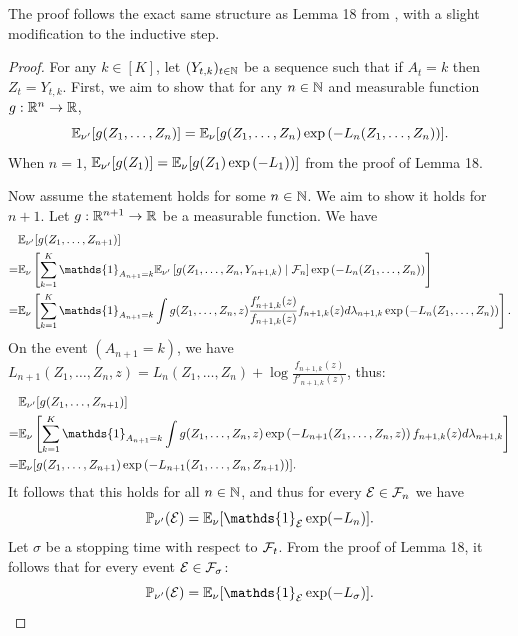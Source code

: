The proof follows the exact same structure as Lemma 18 from \citet{kaufmann2016complexity}, with a slight modification to the inductive step.
\begin{proof}
    For any $k \in [K]$, let $(Y_{t,k})_{t \in \mathbb{N}}$ be a sequence such that if $A_t = k$ then $Z_t  =Y_{t,k}$. First, we aim to show that for any $n \in \mathbb{N}$ and measurable function $g:\mathbb{R}^n \rightarrow \mathbb{R}$, \begin{equation}\mathbb{E}_{\nu'}[g(Z_1,\dots,Z_{n})] = \mathbb{E}_{\nu}[g(Z_1,\dots,Z_{n})\exp\left(-L_{n}(Z_1, \ldots, Z_n)\right)].\end{equation} When $n =1 $, $\mathbb{E}_{\nu'}[g(Z_1)] = \mathbb{E}_{\nu}[g(Z_1)\exp\left(-L_{1})\right)]$ from the proof of \citet{kaufmann2016complexity} Lemma 18. 
    
    Now assume the statement holds for some $n \in \mathbb{N}$. We aim to show it holds for $n + 1$. Let  $g:\mathbb{R}^{n+1} \rightarrow \mathbb{R}$ be a measurable function. We have \begin{align*}
    &\E_{\nu'}[g(Z_1,\dots,Z_{n + 1})]\\
    =& \E_{\nu}\left[\sum_{k=1}^{K} \mathds{1}_{A_{n+1}=k} \E_{\nu'} \left[ g(Z_1, \ldots, Z_n, Y_{n+1,k}) \mid \mathcal{F}_n \right] \exp\left(-L_n(Z_1, \ldots, Z_n)\right)
\right] \\
=& \E_{\nu}\left[\sum_{k=1}^{K} \mathds{1}_{A_{n+1}=k} \int  g(Z_1, \ldots, Z_n, z) \frac{f_{n+1, k}'(z)}{f_{n+1, k}(z)}f_{n+1, k}(z)d\lambda_{n+1,k}\exp\left(-L_n(Z_1, \ldots, Z_n)\right)
\right]. \\
\end{align*}
On the event $(A_{n +1} = k)$, we have $L_{n+1}(Z_1, \ldots, Z_n,z) = L_{n}(Z_1, \ldots, Z_n) + \log\frac{f_{n+1, k}(z)}{f'_{n+1, k}(z)}$, thus:
\begin{align*}
    &\E_{\nu'}[g(Z_1,\dots,Z_{n + 1})] \\
    =& \E_{\nu}\left[\sum_{k=1}^{K} \mathds{1}_{A_{n+1}=k} \int  g(Z_1, \ldots, Z_n, z) \exp\left(-L_{n+1}(Z_1, \ldots, Z_n, z)\right)f_{n+1, k}(z)d\lambda_{n+1,k} \right]\\
    =& \E_{\nu}[g(Z_1,\dots,Z_{n + 1})\exp\left(-L_{n+1}(Z_1, \ldots, Z_n, Z_{n+1})\right)].
\end{align*}
It follows that this holds for all $n \in \mathbb{N}$, and thus for every $\mathcal{E} \in \mathcal{F}_n$ we have
\begin{equation}\P_{\nu'}(\mathcal{E}) = \E_{\nu}[\mathds{1}_{\mathcal{E}}\exp(-
L_{n})].\end{equation}
Let $\sigma$ be a stopping time with respect to $\mathcal{F}_t$. From the proof of \citet{kaufmann2016complexity} Lemma 18, it follows that for every event $\mathcal{E} \in \mathcal{F}_\sigma$:
    \begin{equation}\P_{\nu'}(\mathcal{E}) = \E_{\nu}[\mathds{1}_{\mathcal{E}}\exp(-
L_{\sigma})].\end{equation}
\end{proof}

